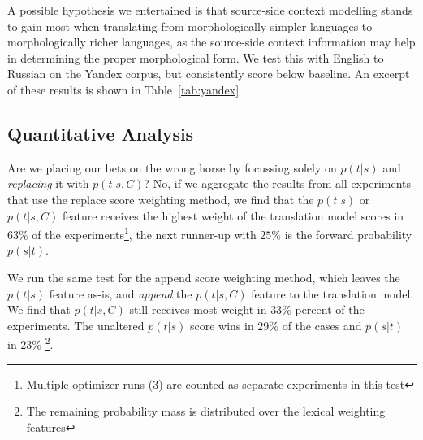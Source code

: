 A possible hypothesis we entertained is that source-side context modelling
stands to gain most when translating from morphologically simpler languages to
morphologically richer languages, as the source-side context information may
help in determining the proper morphological form. We test this with English to
Russian on the Yandex corpus, but consistently score below baseline. An excerpt
of these results is shown in Table~\ref{tab:yandex}


\begin{table}
\noindent{}
\caption{An excerpt of the results on the Yandex corpus, English to Russian. No METEOR scores are available.} %
\label{tab:yandex}
\end{table}


\subsection{Quantitative Analysis}
\label{sec:quantanal}

Are we placing our bets on the wrong horse by focussing solely on $p(t|s)$ and
\emph{replacing} it with $p(t|s,C)$? No, if we aggregate the results from all
experiments that use the replace score weighting method, we find that the
$p(t|s)$ or $p(t|s,C)$ feature receives the highest weight of the translation
model scores in $63\%$ of the experiments\footnote{Multiple
optimizer runs (3) are counted as separate experiments in this test}, the next runner-up with $25\%$ is the forward probability
$p(s|t)$. 

We run the same test for the append score weighting method, which leaves the $p(t|s)$ feature as-is, and
\emph{append} the $p(t|s,C)$ feature to the translation model.  We find that
$p(t|s,C)$ still receives most weight in $33\%$ percent of the experiments.
The unaltered $p(t|s)$ score wins in $29\%$ of the cases and $p(s|t)$ in
$23\%$ \footnote{The remaining probability mass is distributed over the lexical
weighting features}.

